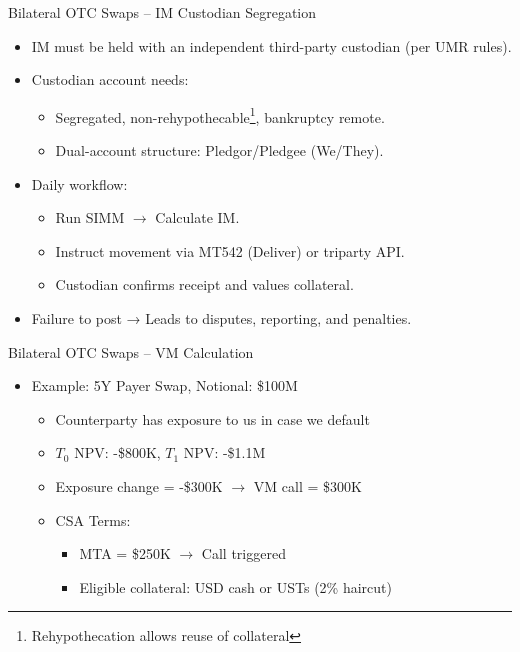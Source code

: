 \documentclass[handout, aspectratio=169]{beamer}
\begin{document}
\begin{frame}{Bilateral OTC Swaps – IM Custodian Segregation}
  \begin{itemize}
    \item IM must be held with an independent third-party custodian (per UMR rules).
    \item Custodian account needs:
    \begin{itemize}
      \item Segregated, non-rehypothecable\footnote{Rehypothecation allows reuse of collateral}, bankruptcy remote.
      \item Dual-account structure: Pledgor/Pledgee (We/They).
    \end{itemize}
    \item Daily workflow:
    \begin{itemize}
      \item Run SIMM $\rightarrow$ Calculate IM.
      \item Instruct movement via MT542 (Deliver) or triparty API.
      \item Custodian confirms receipt and values collateral.
    \end{itemize}
    \item Failure to post → Leads to disputes, reporting, and penalties.
  \end{itemize}
\end{frame}

\begin{frame}{Bilateral OTC Swaps – VM Calculation}
  \begin{itemize}
    \item Example: 5Y Payer Swap, Notional: \$100M
    \begin{itemize}
      \item Counterparty has exposure to us in case we default
      \item $T_0$ NPV: -\$800K, $T_1$ NPV: -\$1.1M
      \item Exposure change = -\$300K $\rightarrow$ VM call = \$300K
      \item CSA Terms:
      \begin{itemize}
        \item MTA = \$250K $\rightarrow$ Call triggered
        \item Eligible collateral: USD cash or USTs (2\% haircut)
      \end{itemize}
    \end{itemize}
  \end{itemize}
\end{frame}
\end{document}

